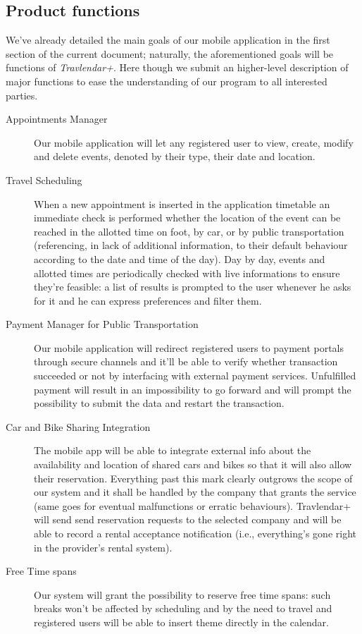 	\subsection{Product functions}
	
 		We’ve already detailed the main goals of our mobile application in the first section of the current document; naturally, the aforementioned goals will be functions of \textit{Travlendar+}.
 		Here though we submit an higher-level description of major functions to ease the understanding of our program to all interested parties.
		
		\begin{description}
			\item[Appointments Manager]
			Our mobile application will let any registered user to view, create, modify and delete events, denoted by their type, their date and location.

			\item[Travel Scheduling] 
			When a new appointment is inserted in the application timetable an immediate check is performed whether the location of the event can be reached in the allotted time on foot, by car, or by public transportation (referencing, in lack of additional information, to their default behaviour according to the date and time of the day).
			Day by day, events and allotted times are periodically checked with live informations to ensure they’re feasible: a list of results is prompted to the user whenever he asks for it and he can express preferences and filter them.
			
			\item[Payment Manager for Public Transportation]
			Our mobile application will redirect registered users to payment portals through secure channels and it’ll be able to verify whether transaction succeeded or not by interfacing with external payment services.
			Unfulfilled payment will result in an impossibility to go forward and will prompt the possibility to submit the data and restart the transaction.

			\item[Car and Bike Sharing Integration]
			The mobile app will be able to integrate external info about the availability and location of shared cars and bikes so that it will also allow their reservation.
			Everything past this mark clearly outgrows the scope of our system and it shall be handled by the company that grants the service (same goes for eventual malfunctions or erratic behaviours). 
			Travlendar+ will send send reservation requests to the selected company and will be able to record a rental acceptance notification (i.e., everything’s gone right in the provider’s rental system).
			
			\item[Free Time spans]
			Our system will grant the possibility to reserve free time spans: such breaks won’t be affected by scheduling and by the need to travel and registered users will be able to insert theme directly in the calendar.

		\end{description}


